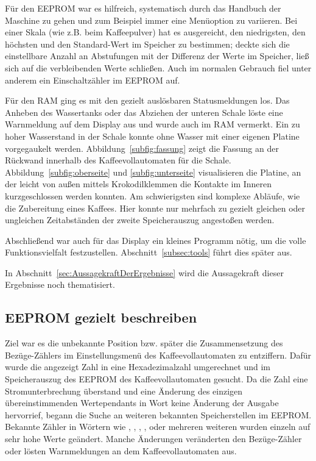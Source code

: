 Für den \ac{EEPROM} war es hilfreich, systematisch durch das Handbuch der Maschine zu gehen und zum Beispiel immer eine Menüoption zu variieren.
Bei einer Skala (wie z.B. beim Kaffeepulver) hat es ausgereicht, den niedrigsten, den höchsten und den Standard-Wert im Speicher zu bestimmen;
deckte sich die einstellbare Anzahl an Abstufungen mit der Differenz der Werte im Speicher, ließ sich auf die verbleibenden Werte schließen.
Auch im normalen Gebrauch fiel unter anderem ein Einschaltzähler im \ac{EEPROM} auf.

Für den \ac{RAM} ging es mit den gezielt auslösbaren Statusmeldungen los.
Das Anheben des Wassertanks oder das Abziehen der unteren Schale löste eine Warnmeldung auf dem Display aus und wurde auch im \ac{RAM} vermerkt.
Ein zu hoher Wasserstand in der Schale konnte ohne Wasser mit einer eigenen Platine vorgegaukelt werden.
Abbildung~\ref{subfig:fassung} zeigt die Fassung an der Rückwand innerhalb des Kaffeevollautomaten für die Schale.
Abbildung~\ref{subfig:oberseite} und \ref{subfig:unterseite} visualisieren die Platine, an der leicht von außen mittels Krokodilklemmen die Kontakte im Inneren kurzgeschlossen werden konnten.
Am schwierigsten sind komplexe Abläufe, wie die Zubereitung eines Kaffees.
Hier konnte nur mehrfach zu gezielt gleichen oder ungleichen Zeitabständen der zweite Speicherauszug angestoßen werden.

Abschließend war auch für das Display ein kleines Programm nötig, um die volle Funktionsvielfalt festzustellen.
Abschnitt~\ref{subsec:tools} führt dies später aus.

In Abschnitt~\ref{sec:AussagekraftDerErgebnisse} wird die Aussagekraft dieser Ergebnisse noch thematisiert.

\subsection{EEPROM gezielt beschreiben}\label{subsec:Vorgehen2}
Ziel war es die unbekannte Position bzw. später die Zusammensetzung des Bezüge-Zählers im Einstellungsmenü des Kaffeevollautomaten zu entziffern.
Dafür wurde die angezeigt Zahl in eine Hexadezimalzahl umgerechnet und im Speicherauszug des \ac{EEPROM} des Kaffeevollautomaten gesucht.
Da die Zahl eine Stromunterbrechung überstand und eine Änderung des einzigen übereinstimmenden Wertependants in Wort  keine Änderung der Ausgabe hervorrief, begann die Suche an weiteren bekannten Speicherstellen im \ac{EEPROM}.
Bekannte Zähler in Wörtern wie , , , ,  oder mehreren weiteren wurden einzeln auf sehr hohe Werte geändert.
Manche Änderungen veränderten den Bezüge-Zähler oder lösten Warnmeldungen an dem Kaffeevollautomaten aus.

